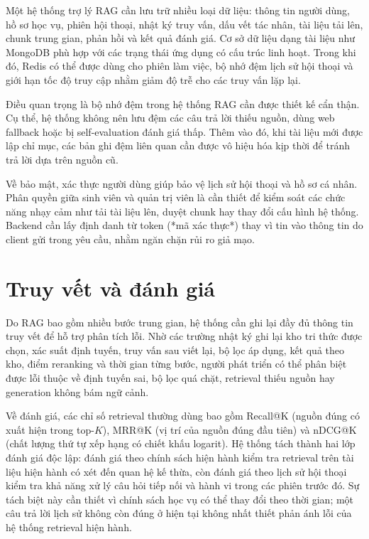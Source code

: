 \documentclass[../DoAn.tex]{subfiles}
\begin{document}
Một hệ thống trợ lý RAG cần lưu trữ nhiều loại dữ liệu: thông tin người dùng,
hồ sơ học vụ, phiên hội thoại, nhật ký truy vấn, dấu vết tác nhân, tài liệu
tải lên, chunk trung gian, phản hồi và kết quả đánh giá. Cơ sở dữ liệu dạng
tài liệu như MongoDB phù hợp với các trạng thái ứng dụng có cấu trúc linh hoạt.
Trong khi đó, Redis có thể được dùng cho phiên làm việc, bộ nhớ đệm lịch sử
hội thoại và giới hạn tốc độ truy cập nhằm giảm độ trễ cho các truy vấn lặp
lại.

Điều quan trọng là bộ nhớ đệm trong hệ thống RAG cần được thiết kế cẩn thận.
Cụ thể, hệ thống không nên lưu đệm các câu trả lời thiếu nguồn, dùng web
fallback hoặc bị self-evaluation đánh giá thấp. Thêm vào đó, khi tài liệu mới
được lập chỉ mục, các bản ghi đệm liên quan cần được vô hiệu hóa kịp thời để
tránh trả lời dựa trên nguồn cũ.

Về bảo mật, xác thực người dùng giúp bảo vệ lịch sử hội thoại và hồ sơ cá
nhân. Phân quyền giữa sinh viên và quản trị viên là cần thiết để kiểm soát các
chức năng nhạy cảm như tải tài liệu lên, duyệt chunk hay thay đổi cấu hình hệ
thống. Backend cần lấy định danh từ token (*mã xác thực*) thay vì tin vào thông
tin do client gửi trong yêu cầu, nhằm ngăn chặn rủi ro giả mạo.

\section{Truy vết và đánh giá}

Do RAG bao gồm nhiều bước trung gian, hệ thống cần ghi lại đầy đủ thông tin
truy vết để hỗ trợ phân tích lỗi. Nhờ các trường nhật ký ghi lại kho tri thức
được chọn, xác suất định tuyến, truy vấn sau viết lại, bộ lọc áp dụng, kết
quả theo kho, điểm reranking và thời gian từng bước, người phát triển có thể
phân biệt được lỗi thuộc về định tuyến sai, bộ lọc quá chặt, retrieval thiếu
nguồn hay generation không bám ngữ cảnh.

Về đánh giá, các chỉ số retrieval thường dùng bao gồm Recall@K (nguồn đúng có
xuất hiện trong top-$K$), MRR@K (vị trí của nguồn đúng đầu tiên) và nDCG@K
(chất lượng thứ tự xếp hạng có chiết khấu logarit). Hệ thống tách thành hai
lớp đánh giá độc lập: đánh giá theo chính sách hiện hành kiểm tra retrieval
trên tài liệu hiện hành có xét đến quan hệ kế thừa, còn đánh giá theo lịch sử
hội thoại kiểm tra khả năng xử lý câu hỏi tiếp nối và hành vi trong các phiên
trước đó. Sự tách biệt này cần thiết vì chính sách học vụ có thể thay đổi theo
thời gian; một câu trả lời lịch sử không còn đúng ở hiện tại không nhất thiết
phản ánh lỗi của hệ thống retrieval hiện hành.
\end{document}
